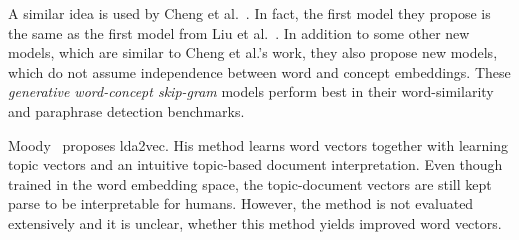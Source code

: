 \documentclass[
        a4paper,
        titlepage,
        twoside,
        parskip
        ]{scrbook}
\theoremstyle{break}
\begin{document}
A similar idea is used by Cheng et al.~\cite{Cheng2015}.
In fact, the first model they propose is the same as the first model from Liu et al.~\cite{Liu2015}.
In addition to some other new models, which are similar to Cheng et al.'s work, they also propose new models, which do not assume independence between word and concept embeddings.
These \emph{generative word-concept skip-gram} models perform best in their word-similarity and paraphrase detection benchmarks.

Moody~\cite{Moody2016} proposes lda2vec.
His method learns word vectors together with learning topic vectors and an intuitive topic-based document interpretation.
Even though trained in the word embedding space, the topic-document vectors are still kept parse to be interpretable for humans.
However, the method is not evaluated extensively and it is unclear, whether this method yields improved word vectors.




\end{document}
